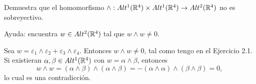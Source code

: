 \documentclass[twoside]{article}
\begin{document}
\newpage

\begin{ejercicio}{2}
Demuestra que el homomorfismo $\land: Alt^1(\mathbb{R}^4)\times Alt^1(\mathbb{R}^4)\to Alt^2(\mathbb{R}^4)$ no es sobreyectivo. 

Ayuda: encuentra $w\in Alt^2(\mathbb{R}^4)$ tal que $w\land w\neq 0$.
\end{ejercicio}
\begin{solucion}
Sea $w=\varepsilon_1\land \varepsilon_2+\varepsilon_3\land\varepsilon_4$. Entonces $w\land w\neq 0$, tal como tengo en el Ejercicio 2.1. Si existieran $\alpha,\beta\in Alt^1(\mathbb{R}^4)$ con $w=\alpha\land\beta$, entonces 
\[
w\land w=(\alpha\land\beta)\land(\alpha\land\beta)=-(\alpha\land\alpha)\land(\beta\land\beta)=0,
\]
lo cual es una contradicción.
\end{solucion}
\newpage

\begin{ejercicio}{3}

\end{ejercicio}
\begin{solucion}

\end{solucion}
\newpage

\begin{ejercicio}{4}

\end{ejercicio}
\begin{solucion}

\end{solucion}

\newpage

\begin{ejercicio}{5}

\end{ejercicio}
\begin{solucion}

\end{solucion}
\end{document}
